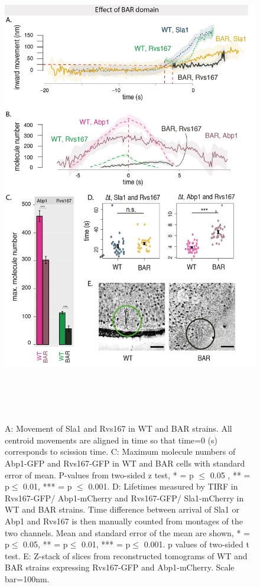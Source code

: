 \begin{figure}
	\centering
	\includegraphics[width=21cm,height=21cm,keepaspectratio]{figures/results_final/delsh3_8}
	\caption [Effect of the Rvs167 SH3 deletion]
	{A: Movement of Sla1 and Rvs167 in WT and BAR strains. All centroid movements are aligned in time so that time=0 (s) corresponds to scission time. 
	C: Maximum molecule numbers of Abp1-GFP and Rvs167-GFP in WT and BAR cells with standard error of mean. P-values from two-sided z test, * = p $\leq$ 0.05 , ** = p$\leq$ 0.01, *** = p $\leq$ 0.001. 
	D: Lifetimes measured by TIRF in Rvs167-GFP/ Abp1-mCherry and Rvs167-GFP/ Sla1-mCherry in WT and BAR strains. Time difference between arrival of Sla1 or Abp1 and Rvs167 is then manually counted from montages of the two channels. Mean and standard error of the mean are shown, * = p$\leq$ 0.05, ** = p$\leq$ 0.01, *** = p$\leq$ 0.001. p values of two-sided t test.
	E: Z-stack of slices from reconstructed tomograms of WT and BAR strains expressing Rvs167-GFP and Abp1-mCherry.  Scale bar=100nm.
	\label{fig2_sh3del}}

	\end{figure}
	\vspace{5mm}
	
